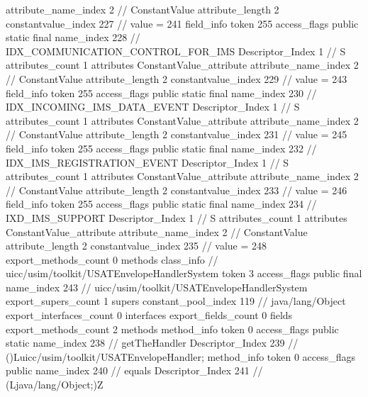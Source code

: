{{{{{{{					attribute_name_index	2		// ConstantValue
					attribute_length	2
					constantvalue_index	227		// value = 241
				}
				}
			}
			field_info {
				token	255
				access_flags	public static final
				name_index	228		// IDX_COMMUNICATION_CONTROL_FOR_IMS
				Descriptor_Index	1		// S
				attributes_count	1
				attributes {
				ConstantValue_attribute {
					attribute_name_index	2		// ConstantValue
					attribute_length	2
					constantvalue_index	229		// value = 243
				}
				}
			}
			field_info {
				token	255
				access_flags	public static final
				name_index	230		// IDX_INCOMING_IMS_DATA_EVENT
				Descriptor_Index	1		// S
				attributes_count	1
				attributes {
				ConstantValue_attribute {
					attribute_name_index	2		// ConstantValue
					attribute_length	2
					constantvalue_index	231		// value = 245
				}
				}
			}
			field_info {
				token	255
				access_flags	public static final
				name_index	232		// IDX_IMS_REGISTRATION_EVENT
				Descriptor_Index	1		// S
				attributes_count	1
				attributes {
				ConstantValue_attribute {
					attribute_name_index	2		// ConstantValue
					attribute_length	2
					constantvalue_index	233		// value = 246
				}
				}
			}
			field_info {
				token	255
				access_flags	public static final
				name_index	234		// IXD_IMS_SUPPORT
				Descriptor_Index	1		// S
				attributes_count	1
				attributes {
				ConstantValue_attribute {
					attribute_name_index	2		// ConstantValue
					attribute_length	2
					constantvalue_index	235		// value = 248
				}
				}
			}
			}
			export_methods_count	0
			methods {
			}
		}
		class_info {		// uicc/usim/toolkit/USATEnvelopeHandlerSystem
			token	3
			access_flags	public final
			name_index	243		// uicc/usim/toolkit/USATEnvelopeHandlerSystem
			export_supers_count	1
			supers {
				constant_pool_index	119		// java/lang/Object
			}
			export_interfaces_count	0
			interfaces {
			}
			export_fields_count	0
			fields {
			}
			export_methods_count	2
			methods {
				method_info {
					token	0
					access_flags	public static
					name_index	238		// getTheHandler
					Descriptor_Index	239		// ()Luicc/usim/toolkit/USATEnvelopeHandler;
				}
				method_info {
					token	0
					access_flags	public
					name_index	240		// equals
					Descriptor_Index	241		// (Ljava/lang/Object;)Z
				}
			}
		}
	}
}
